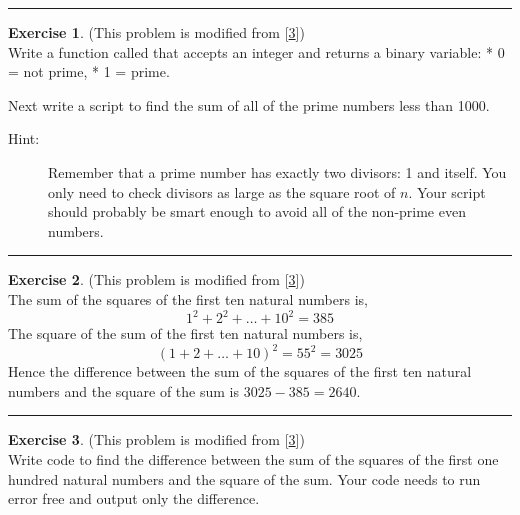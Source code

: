 \documentclass[
]{book}
\theoremstyle{definition}
\theoremstyle{definition}
\theoremstyle{definition}
\newtheorem{exercise}{Exercise}[chapter]
\theoremstyle{remark}
\begin{document}
\begin{center}\rule{0.5\linewidth}{0.5pt}\end{center}

\begin{exercise}
\protect\hypertarget{exr:unnamed-chunk-56}{}{\label{exr:unnamed-chunk-56} }(This problem is modified from {[}\protect\hyperlink{ref-euler}{3}{]})\\
Write a function called that accepts an integer and returns a binary
variable:
* 0 = not prime,
* 1 = prime.

Next write a script to find the sum of all of the prime numbers less than 1000.

\begin{description}
\item[Hint:]
Remember that a prime number has exactly two divisors: 1 and itself. You only need to check divisors as large as the square root of \(n\). Your script should probably be smart enough to avoid all of the non-prime even numbers.
\end{description}
\end{exercise}

\begin{center}\rule{0.5\linewidth}{0.5pt}\end{center}

\begin{exercise}
\protect\hypertarget{exr:unnamed-chunk-57}{}{\label{exr:unnamed-chunk-57} }(This problem is modified from {[}\protect\hyperlink{ref-euler}{3}{]})\\
The sum of the squares of the first ten natural numbers is,
\[1^2 + 2^2 + \dots + 10^2 = 385\] The square of the sum of the first
ten natural numbers is, \[(1 + 2 + \dots + 10)^2 = 55^2 = 3025\] Hence
the difference between the sum of the squares of the first ten natural
numbers and the square of the sum is \(3025 - 385 = 2640\).
\end{exercise}

\begin{center}\rule{0.5\linewidth}{0.5pt}\end{center}

\begin{exercise}
\protect\hypertarget{exr:unnamed-chunk-58}{}{\label{exr:unnamed-chunk-58} }(This problem is modified from {[}\protect\hyperlink{ref-euler}{3}{]})\\
Write code to find the difference between the sum of the squares of the
first one hundred natural numbers and the square of the sum. Your code
needs to run error free and output only the difference.
\end{exercise}
\end{document}

